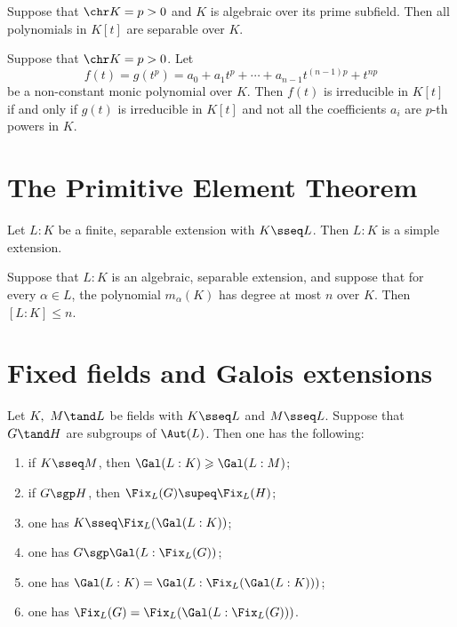 \documentclass{article}
\begin{document}
  \begin{tcorollary}
    Suppose that \( \chr K = p > 0 \) and \( K \) is algebraic over its prime subfield. Then all polynomials in \( K[t] \) are separable over \( K \).
  \end{tcorollary}

  \begin{ttheorem}
    Suppose that \( \chr K = p > 0 \). Let
    \[
      f(t)=g(t^p)=a_0+a_1t^p+\cdots+a_{n-1}t^{(n-1)p}+t^{np}
    \]
    be a non-constant monic polynomial over \( K \). Then \( f(t) \) is irreducible in \( K[t] \) if and only if \( g(t) \) is irreducible in \( K[t] \) and not all the coefficients \( a_i \) are \( p \)-th powers in \( K \).
  \end{ttheorem}

\section{The Primitive Element Theorem}
  \begin{ttheorem}
    Let \( L:K \) be a finite, separable extension with \( K\sseq L \). Then \( L:K \) is a simple extension.
  \end{ttheorem}

  \begin{tcorollary}
    Suppose that \( L:K \) is an algebraic, separable extension, and suppose that for every \( \alpha\in L \), the polynomial \( m_\alpha(K) \) has degree at most \( n \) over \( K \). Then \( [L:K]\leq n \).
  \end{tcorollary}

\section{Fixed fields and Galois extensions}
  \begin{tproposition}
    Let \( K,\ M \tand L \) be fields with \( K\sseq L \) and \( M\sseq L \). Suppose that \( G\tand H \) are subgroups of \( \Aut(L) \). Then one has the following:
    \begin{enumerate}[label=(\alph*)]
      \item if \( K\sseq M \), then \( \Gal(L:K) \geqslant \Gal(L:M) \);
      \item if \( G\sgp H \), then \( \Fix_L(G)\supeq \Fix_L(H) \);
      \item one has \( K\sseq \Fix_L(\Gal(L:K)) \);
      \item one has \( G\sgp\Gal(L:\Fix_L(G)) \);
      \item one has \( \Gal(L:K) = \Gal(L:\Fix_L(\Gal(L:K))) \);
      \item one has \( \Fix_L(G) = \Fix_L(\Gal(L:\Fix_L(G))) \).
    \end{enumerate}
  \end{tproposition}
\end{document}
